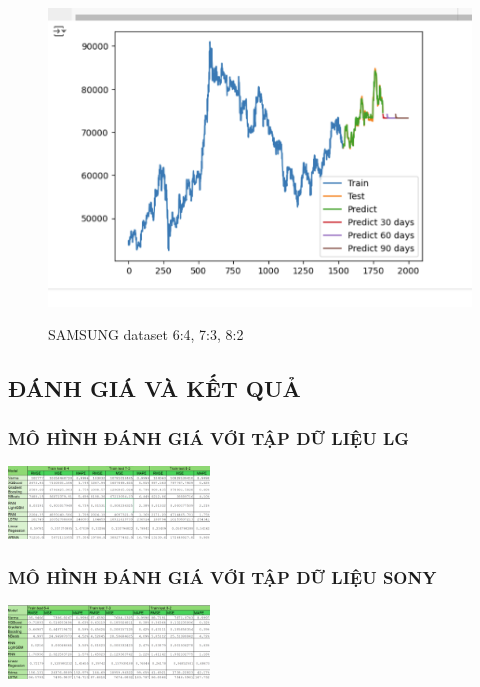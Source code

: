 \documentclass[conference]{IEEEtran}
\begin{document}
\begin{figure}[H]
\begin{minipage}{0.15\textwidth}
    \label{fig:2}
    \end{minipage}%
    \begin{minipage}{0.15\textwidth}
    \centering
    \includegraphics[width=1\textwidth]{Image/Light GBM/LightGBM_SS_8_2.png}

    \label{fig:3}
    \end{minipage}
    \caption{SAMSUNG dataset  6:4, 7:3, 8:2 }
\end{figure}


\subsection{ĐÁNH GIÁ VÀ KẾT QUẢ }
\subsubsection{MÔ HÌNH ĐÁNH GIÁ VỚI TẬP DỮ LIỆU LG }
\includegraphics[width=0.4\textwidth]{Image/ket qua/LG_metrics.png}
\subsubsection{MÔ HÌNH ĐÁNH GIÁ VỚI TẬP DỮ LIỆU SONY}
\includegraphics[width=0.4\textwidth]{Image/ket qua/SONY_metrics.png}
\end{document}
